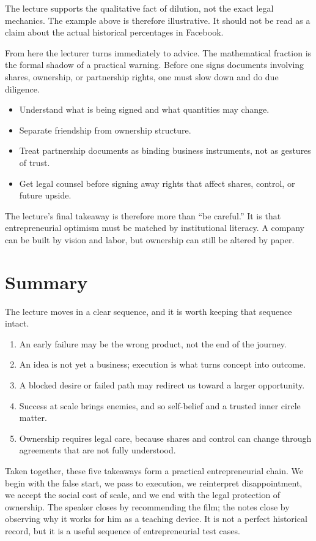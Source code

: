 \begin{remark}
The lecture supports the qualitative fact of dilution, not the exact legal mechanics. The example above is therefore illustrative. It should not be read as a claim about the actual historical percentages in Facebook.
\end{remark}

From here the lecturer turns immediately to advice. The mathematical fraction is the formal shadow of a practical warning. Before one signs documents involving shares, ownership, or partnership rights, one must slow down and do due diligence.

\begin{itemize}
\item Understand what is being signed and what quantities may change.
\item Separate friendship from ownership structure.
\item Treat partnership documents as binding business instruments, not as gestures of trust.
\item Get legal counsel before signing away rights that affect shares, control, or future upside.
\end{itemize}

The lecture's final takeaway is therefore more than ``be careful.'' It is that entrepreneurial optimism must be matched by institutional literacy. A company can be built by vision and labor, but ownership can still be altered by paper.

\section{Summary}

The lecture moves in a clear sequence, and it is worth keeping that sequence intact.

\begin{enumerate}
\item An early failure may be the wrong product, not the end of the journey.
\item An idea is not yet a business; execution is what turns concept into outcome.
\item A blocked desire or failed path may redirect us toward a larger opportunity.
\item Success at scale brings enemies, and so self-belief and a trusted inner circle matter.
\item Ownership requires legal care, because shares and control can change through agreements that are not fully understood.
\end{enumerate}

Taken together, these five takeaways form a practical entrepreneurial chain. We begin with the false start, we pass to execution, we reinterpret disappointment, we accept the social cost of scale, and we end with the legal protection of ownership. The speaker closes by recommending the film; the notes close by observing why it works for him as a teaching device. It is not a perfect historical record, but it is a useful sequence of entrepreneurial test cases.
